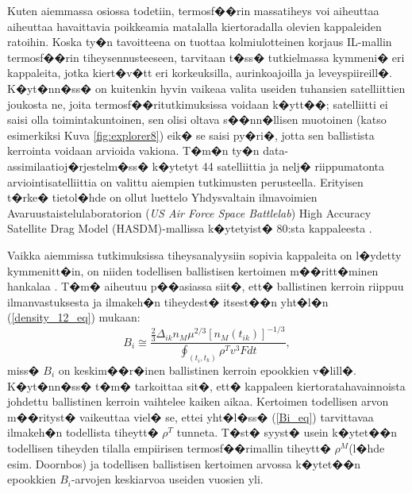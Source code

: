 \documentclass[12pt,a4paper,finnish,margin=2in]{article}
\begin{document}
Kuten aiemmassa osiossa todetiin, termosf��rin massatiheys voi aiheuttaa aiheuttaa havaittavia poikkeamia matalalla kiertoradalla olevien kappaleiden ratoihin. Koska ty�n tavoitteena on tuottaa kolmiulotteinen korjaus IL-mallin termosf��rin tiheysennusteeseen, tarvitaan t�ss� tutkielmassa kymmeni� eri kappaleita, jotka kiert�v�tt eri korkeuksilla, aurinkoajoilla ja leveyspiireill�. K�yt�nn�ss� on kuitenkin hyvin vaikeaa valita useiden tuhansien satelliittien joukosta ne, joita termosf��ritutkimuksissa voidaan k�ytt��; satelliitti ei saisi olla toimintakuntoinen, sen olisi oltava s��nn�llisen muotoinen (katso esimerkiksi Kuva \ref{fig:explorer8}) eik� se saisi py�ri�, jotta sen ballistista kerrointa voidaan arvioida vakiona. T�m�n ty�n data-assimilaatioj�rjestelm�ss� k�ytetyt 44 satelliittia ja nelj� riippumatonta arviointisatelliittia on valittu aiempien tutkimusten \citep[esim.][]{emmert_2004,saunders_2011} perusteella. Erityisen t�rke� tietol�hde on ollut luettelo Yhdysvaltain ilmavoimien Avaruustaistelulaboratorion (\textit{US Air Force Space Battlelab}) High Accuracy Satellite Drag Model (HASDM)-mallissa k�ytetyist� 80:sta kappaleesta \citep{doornbos_2004}. 

Vaikka aiemmissa tutkimuksissa tiheysanalyysiin sopivia kappaleita on l�ydetty kymmenitt�in, on niiden todellisen ballistisen kertoimen m��ritt�minen hankalaa \citep{bowman_2002}. T�m� aiheutuu p��asiassa siit�, ett� ballistinen kerroin riippuu ilmanvastuksesta ja ilmakeh�n tiheydest� itsest��n yht�l�n (\ref{density_12_eq}) mukaan:
\begin{equation} \label{Bi_eq}
B_i \cong  \frac{\frac{2}{3} \Delta_{ik}n_M \mu^{2/3} \left [ n_M(t_{ik}) \right ]^{-1/3}}{\oint_{(t_i,t_k)} \rho^T v^3 F dt},
\end{equation}
miss� $B_i$ on keskim��r�inen ballistinen kerroin epookkien v�lill�. K�yt�nn�ss� t�m� tarkoittaa sit�, ett� kappaleen kiertoratahavainnoista johdettu ballistinen kerroin vaihtelee kaiken aikaa. Kertoimen todellisen arvon m��rityst� vaikeuttaa viel� se, ettei yht�l�ss� (\ref{Bi_eq}) tarvittavaa ilmakeh�n todellista tiheytt� $\rho^T$ tunneta. T�st� syyst� usein k�ytet��n todellisen tiheyden tilalla empiirisen termosf��rimallin tiheytt� $\rho^M$(l�hde esim. Doornbos) ja todellisen ballistisen kertoimen arvossa k�ytet��n epookkien $B_i$-arvojen keskiarvoa useiden vuosien yli. 
\end{document}
